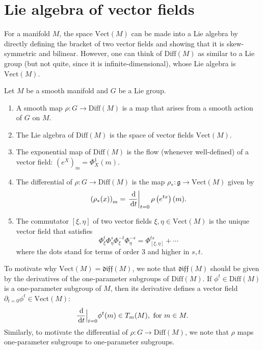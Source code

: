 \documentclass{report}
\begin{document}
\section{Lie algebra of vector fields}
For a manifold $M$, the space $\mathrm{Vect}(M)$ can be made into a Lie algebra by directly defining the bracket of two vector fields and showing that it is skew-symmetric and bilinear.
However, one can think of $\mathrm{Diff}(M)$ as similar to a Lie group (but not quite, since it is infinite-dimensional), whose Lie algebra is $\mathrm{Vect}(M)$.
\begin{definition}
    Let $M$ be a smooth manifold and $G$ be a Lie group.
    \begin{enumerate}[label = (\roman*)]
        \item A smooth map $\rho: G \to \mathrm{Diff}(M)$ is a map that arises from a smooth action of $G$ on $M$.
        \item The Lie algebra of $\mathrm{Diff}(M)$ is the space of vector fields $\mathrm{Vect}(M)$.
        \item The exponential map of $\mathrm{Diff}(M)$ is the flow (whenever well-defined) of a vector field: $\left(e^X\right)_m = \Phi^1_X(m)$.
        \item The differential of $\rho: G \to \mathrm{Diff}(M)$ is the map $\rho_*: \mathfrak g \to \mathrm{Vect}(M)$ given by
        \[
        \left(\rho_*(x)\right)_m = \left.\frac{\,\mathrm{d}}{\,\mathrm{d} t}\right|_{t=0} \rho\left(e^{tx}\right)(m).
        \]
        \item The commutator $[\xi, \eta]$ of two vector fields $\xi, \eta \in \mathrm{Vect}(M)$ is the unique vector field that satisfies
        \[
        \Phi^t_\xi \Phi^s_\eta \Phi^{-t}_\xi \Phi^{-s}_\eta = \Phi^{ts}_{[\xi, \eta]} + \cdots
        \]
        where the dots stand for terms of order 3 and higher in $s,t$.
    \end{enumerate}
\end{definition}

\begin{remark}
    To motivate why $\mathrm{Vect}(M) = \mathfrak{diff}(M)$, we note that $\mathfrak{diff}(M)$ should be given by the derivatives of the one-parameter subgroups of $\mathrm{Diff}(M)$.
    If $\phi^t \in \mathrm{Diff}(M)$ is a one-parameter subgroup of $M$, then its derivative defines a vector field $\partial_{t=0} \phi^t \in \mathrm{Vect}(M)$:
    \[
    \frac{\,\mathrm{d}}{\,\mathrm{d} t}\Big|_{t=0} \phi^t(m) \in T_m(M), \text{ for } m \in M.
    \]
    Similarly, to motivate the differential of $\rho: G \to \mathrm{Diff}(M)$, we note that $\rho$ maps one-parameter subgroups to one-parameter subgroups.
\end{remark}
\end{document}
